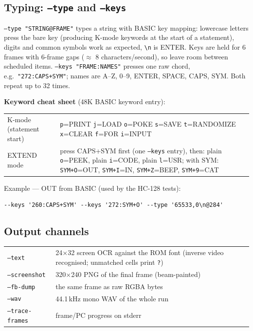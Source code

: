 \documentclass[11pt,a4paper]{article}
\newcommand{\opt}[1]{\texttt{#1}}
\begin{document}
\subsection{Typing: \opt{--type} and \opt{--keys}}

\opt{--type "STRING@FRAME"} types a string with BASIC key mapping:
lowercase letters press the bare key (producing K-mode keywords at the
start of a statement), digits and common symbols work as expected,
\verb|\n| is ENTER. Keys are held for 6 frames with 6-frame gaps
($\approx$ 8 characters/second), so leave room between scheduled
items. \opt{--keys "FRAME:NAMES"} presses one raw chord, e.g.\
\texttt{"272:CAPS+SYM"}; names are A--Z, 0--9, ENTER, SPACE, CAPS,
SYM. Both repeat up to 32 times.

\textbf{Keyword cheat sheet} (48K BASIC keyword entry):

\begin{tabularx}{\textwidth}{lX}
\toprule
K-mode (statement start) & \texttt{p}=PRINT \quad \texttt{j}=LOAD
\quad \texttt{o}=POKE \quad \texttt{s}=SAVE \quad \texttt{t}=RANDOMIZE
\quad \texttt{x}=CLEAR \quad \texttt{f}=FOR \quad \texttt{i}=INPUT \\
EXTEND mode & press CAPS+SYM first (one \opt{--keys} entry), then:
plain \texttt{o}=PEEK, plain \texttt{i}=CODE, plain \texttt{l}=USR;
with SYM: \texttt{SYM+O}=OUT, \texttt{SYM+I}=IN, \texttt{SYM+Z}=BEEP,
\texttt{SYM+9}=CAT \\
\bottomrule
\end{tabularx}

Example --- OUT from BASIC (used by the HC-128 tests):

\begin{Verbatim}
--keys '260:CAPS+SYM' --keys '272:SYM+O' --type '65533,0\n@284'
\end{Verbatim}

\subsection{Output channels}

\begin{tabularx}{\textwidth}{lX}
\toprule
\opt{--text} & 24$\times$32 screen OCR against the ROM font (inverse
video recognised; unmatched cells print \texttt{?}) \\
\opt{--screenshot} & 320$\times$240 PNG of the final frame
(beam-painted) \\
\opt{--fb-dump} & the same frame as raw RGBA bytes \\
\opt{--wav} & 44.1\,kHz mono WAV of the whole run \\
\opt{--trace-frames} & frame/PC progress on stderr \\
\bottomrule
\end{tabularx}
\end{document}
